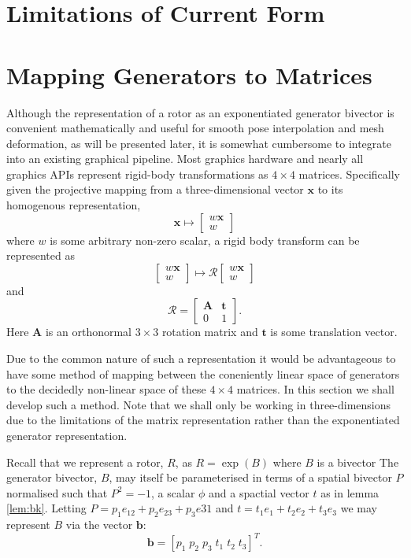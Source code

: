 \section{Limitations of Current Form}


\section{Mapping Generators to Matrices}

Although the representation of a rotor as an exponentiated generator bivector
is convenient mathematically and useful for smooth pose interpolation
and mesh deformation, as will be presented later, it is somewhat cumbersome
to integrate into an existing graphical pipeline. Most graphics hardware and
nearly all graphics APIs represent rigid-body transformations as $4 \times 4$ matrices.
Specifically given the projective mapping from a three-dimensional vector $\mathbf{x}$ to
its homogenous representation,
\[
\mathbf{x} \mapsto \left[ \begin{array}{c}
w \mathbf{x} \\ w
\end{array}\right]
\]
where $w$ is some arbitrary non-zero scalar, a rigid body transform can be represented as
\[
 \left[ \begin{array}{c}
w \mathbf{x} \\ w
\end{array}\right]
\mapsto
 \mathcal{R}\left[ \begin{array}{c}
w \mathbf{x} \\ w
\end{array}\right]
\]
and
\[
\mathcal{R} = \left[
\begin{array}{cc}
\mathbf{A} & \mathbf{t} \\
                0 & 1
\end{array}
\right].
\]
Here $\mathbf{A}$ is an orthonormal $3 \times 3$ rotation matrix and $\mathbf{t}$ is some
translation vector.

Due to the common nature of such a representation it would be advantageous
to have some method of mapping between the coneniently linear space of generators
to the decidedly non-linear space of these $4 \times 4$ matrices. In this section
we shall develop such a method. Note that we shall only be working in three-dimensions due
to the limitations of the matrix representation rather than the exponentiated
generator representation.

Recall that we represent a rotor, $R$, as $R = \exp(B)$ where $B$ is a bivector
The generator bivector, $B$, may itself be
parameterised in terms of a spatial bivector $P$ normalised such that
$P^2 = -1$, a scalar $\phi$ and a spactial vector $t$
as in lemma \ref{lem:bk}.
Letting $P = p_1 e_{12} + p_2 e_{23} + p_3 e{31}$ and
$t = t_1 e_1 + t_2 e_2 + t_3 e_3$ we may represent $B$ via the
vector $\mathbf{b}$:
\[
\mathbf{b} = [ p_1 \; p_2 \; p_3 \; t_1 \; t_2 \; t_3 ]^T.
\]

